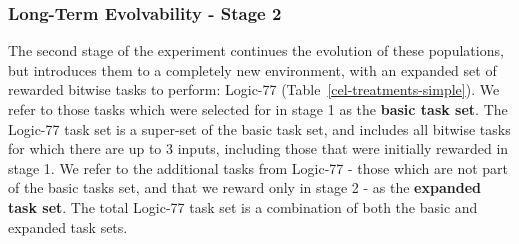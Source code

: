 \documentclass[10pt,letterpaper,final]{article}
\begin{document}
\subsubsection*{Long-Term Evolvability - Stage 2}
The second stage of the experiment continues the evolution of these populations, but introduces them to a completely new environment, with an expanded set of rewarded bitwise tasks to perform: Logic-77 (Table~\ref{cel-treatments-simple}). We refer to those tasks which were selected for in stage 1 as the \textbf{basic task set}. The Logic-77 task set is a super-set of the basic task set, and includes all bitwise tasks for which there are up to 3 inputs, including those that were initially rewarded in stage 1. We refer to the additional tasks from Logic-77 - those which are not part of the basic tasks set, and that we reward only in stage 2 - as the \textbf{expanded task set}. The total Logic-77 task set is a combination of both the basic and expanded task sets.  
\end{document}
